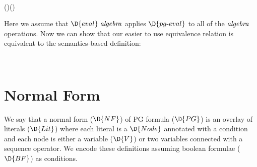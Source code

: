 
\begin{hscode}\SaveRestoreHook
{}%
%
%
\>[B]{}\;\;\;\mathrel{=}\;{}\<[E]%
\\
\>[B]{}\<[4]%
\>[4]{}\;\;\;(\;\mathbin{:}\;\;)\;\;(\;\mathbin{:}\;\;\;)\;\;{}\<[E]%
\\
\>[B]{}\<[4]%
\>[4]{}\;\;\;\;\;\;\;\;\<[E]%
\ColumnHook
\end{hscode}\resethooks

Here we assume that \ensuremath{\D{eval}\;\Varid{algebra}} applies \ensuremath{\D{pg\hyp{}eval}} to all of the \ensuremath{\Varid{algebra}} operations.
Now we can show that our easier to use equivalence relation is equivalent to the semantics-based definition:


\begin{hscode}\SaveRestoreHook
{}%
%
\>[B]{}\;\mathbin{:}\;\;\;\;\;\;\;\;\;\;\;\<[E]%
\\
\>[B]{}\;\mathbin{:}\;\;\;\;\;\;\;\;\;\;\;\<[E]%
\ColumnHook
\end{hscode}\resethooks

\section{Normal Form}


We say that a normal form (\ensuremath{\D{NF}}) of PG formula (\ensuremath{\D{PG}}) is an overlay of literals (\ensuremath{\D{Lit}}) where each literal is a \ensuremath{\D{Node}} annotated with a condition and each node is either a variable (\ensuremath{\D{V}}) or two variables connected with a sequence operator. We encode these definitions assuming boolean formulae (\ensuremath{\D{BF}}) as conditions.

\begin{hscode}\SaveRestoreHook
{}%
%
\>[B]{}\;\mathrel{=}\;\;\;\;\;\<[E]%
\\
\>[B]{}\;\mathrel{=}\;\;\;\<[E]%
\\
\>[B]{}\;\mathrel{=}\;\;\<[E]%
\ColumnHook
\end{hscode}\resethooks

